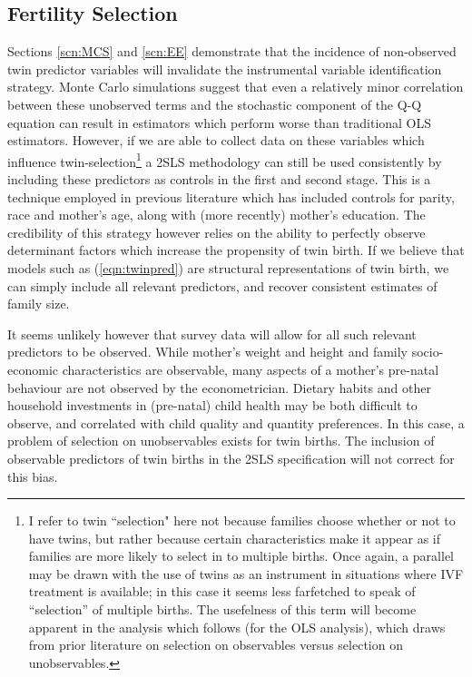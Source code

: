 \documentclass{article}[11pt,subeqn]
\begin{document}
\begin{spacing}{1.5}
\subsection{Fertility Selection}
\label{scn:selection}
Sections \ref{scn:MCS} and \ref{scn:EE} demonstrate that the incidence of non-observed twin predictor variables will invalidate the instrumental variable identification strategy.  
Monte Carlo simulations suggest that even a relatively minor correlation between these unobserved terms and the stochastic component of the Q-Q equation can result in estimators 
which perform worse than traditional OLS estimators.  However, if we are able to collect data on these variables which influence twin-selection\footnote{I refer to twin ``selection" 
here not because families choose whether or not to have twins, but rather because certain characteristics make it appear as if families are more likely to select in to multiple 
births.  Once again, a parallel may be drawn with the use of twins as an instrument in situations where IVF treatment is available; in this case it seems less farfetched to speak 
of ``selection'' of multiple births.  The usefelness of this term will become apparent in the analysis which follows (for the OLS analysis), which draws from prior literature on 
selection on observables versus selection on unobservables.} a 2SLS methodology can still be used consistently by including these predictors as controls in the first and second 
stage.  This is a technique employed in previous literature which has included controls for parity, race and mother's age, along with (more recently) mother's education.  The 
credibility of this strategy however relies on the ability to perfectly observe determinant factors which increase the propensity of twin birth.  If we believe that models such 
as (\ref{eqn:twinpred}) are structural representations of twin birth, we can simply include all relevant predictors, and recover consistent estimates of family size.

It seems unlikely however that survey data will allow for all such relevant predictors to be observed.  While mother's weight and height and family socio-economic characteristics 
are observable, many aspects of a mother's pre-natal behaviour are not observed by the econometrician.  Dietary habits and other household investments in (pre-natal) child health 
may be both difficult to observe, and correlated with child quality and quantity preferences.  In this case, a problem of selection on unobservables exists for twin births.  The 
inclusion of observable predictors of twin births in the 2SLS specification will not correct for this bias.


\end{spacing}
\end{document}
